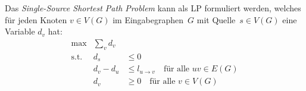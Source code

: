 \documentclass{uebung_cs}
\begin{document}
\newpage
\begin{exercise}
%
%
	Das \emph{Single-Source Shortest Path Problem} kann als \acs{LP} formuliert werden, welches für jeden Knoten $v\in V(G)$ im Eingabegraphen~$G$ mit Quelle~$s\in V(G)$ eine Variable $d_v$ hat:
	\[
		\begin{array}{rrl}
			\text{max}   &  \sum_{v} d_v & 	   \\
			\text{s.t.}  &		   d_s & \leq 0\\
						 &	 d_v - d_u & \leq l_{u \rightarrow v} \quad\text{für alle $uv\in E(G)$}\\
						 &	       d_v & \geq 0\quad\text{für alle $v\in V(G)$}
		\end{array}
	\]
	

\end{exercise}
\end{document}
